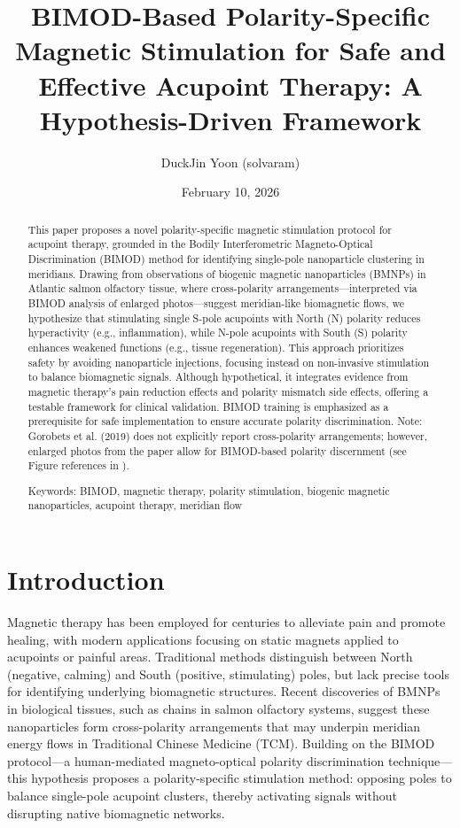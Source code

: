\documentclass{article}
\title{BIMOD-Based Polarity-Specific Magnetic Stimulation for Safe and Effective Acupoint Therapy: A Hypothesis-Driven Framework}
\author{DuckJin Yoon (solvaram)}
\date{February 10, 2026}
\begin{document}
\maketitle

\begin{abstract}
This paper proposes a novel polarity-specific magnetic stimulation protocol for acupoint therapy, grounded in the Bodily Interferometric Magneto-Optical Discrimination (BIMOD) method for identifying single-pole nanoparticle clustering in meridians. Drawing from observations of biogenic magnetic nanoparticles (BMNPs) in Atlantic salmon olfactory tissue, where cross-polarity arrangements—interpreted via BIMOD analysis of enlarged photos—suggest meridian-like biomagnetic flows, we hypothesize that stimulating single S-pole acupoints with North (N) polarity reduces hyperactivity (e.g., inflammation), while N-pole acupoints with South (S) polarity enhances weakened functions (e.g., tissue regeneration). This approach prioritizes safety by avoiding nanoparticle injections, focusing instead on non-invasive stimulation to balance biomagnetic signals. Although hypothetical, it integrates evidence from magnetic therapy's pain reduction effects and polarity mismatch side effects, offering a testable framework for clinical validation. BIMOD training is emphasized as a prerequisite for safe implementation to ensure accurate polarity discrimination. Note: Gorobets et al. (2019) does not explicitly report cross-polarity arrangements; however, enlarged photos from the paper allow for BIMOD-based polarity discernment (see Figure references in \cite{gorobets2019}).

Keywords: BIMOD, magnetic therapy, polarity stimulation, biogenic magnetic nanoparticles, acupoint therapy, meridian flow
\end{abstract}

\section{Introduction}
Magnetic therapy has been employed for centuries to alleviate pain and promote healing, with modern applications focusing on static magnets applied to acupoints or painful areas. Traditional methods distinguish between North (negative, calming) and South (positive, stimulating) poles, but lack precise tools for identifying underlying biomagnetic structures. Recent discoveries of BMNPs in biological tissues, such as chains in salmon olfactory systems, suggest these nanoparticles form cross-polarity arrangements that may underpin meridian energy flows in Traditional Chinese Medicine (TCM)\citep{gorobets2019}. Building on the BIMOD protocol—a human-mediated magneto-optical polarity discrimination technique—this hypothesis proposes a polarity-specific stimulation method: opposing poles to balance single-pole acupoint clusters, thereby activating signals without disrupting native biomagnetic networks.
\end{document}
